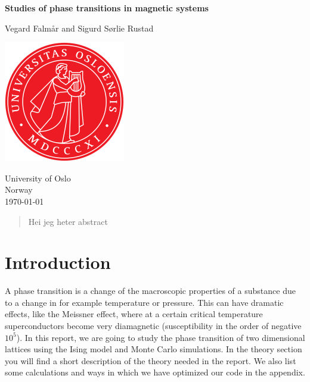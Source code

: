 \documentclass[reprint, english,notitlepage,nofootinbib]{revtex4-1}  %
\begin{document}
\begin{titlepage}
	\begin{center}
	\textbf{Studies of phase transitions in magnetic systems}

	\vspace{0.2cm}
	Vegard Falmår and Sigurd Sørlie Rustad

	\vspace{0.5cm}
	\includegraphics[scale=0.5]{../../pictures/UIO}
	\vspace{0.8cm}

	University of Oslo\\
	Norway\\
	\today	\\
	\end{center}
	\tableofcontents
	\clearpage
\end{titlepage}

\begin{abstract}
Hei jeg heter abstract
\end{abstract}
\maketitle                              %


\section{Introduction}

A phase transition is a change of the macroscopic properties of a substance due to a change in for example temperature or pressure. This can have dramatic effects, like the Meissner effect, where at a certain critical temperature superconductors become very diamagnetic (susceptibility in the order of  negative $10^5$). In this report, we are going to study the phase transition of two dimensional lattices using the Ising model and Monte Carlo simulations. In the theory section you will find a short description of the theory needed in the report. We also list some calculations and ways in which we have optimized our code in the appendix.
\end{document}
